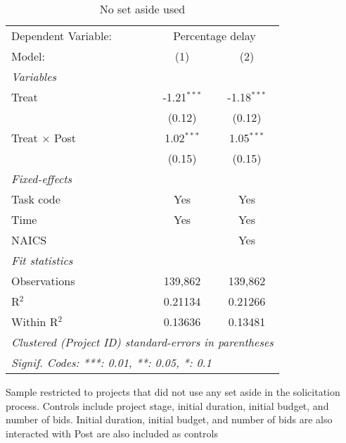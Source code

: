 \documentclass[
]{article}
\begin{document}
\begin{table}[htbp]
   \caption{No set aside used}
   \centering
   \begin{tabular}{lcc}
      \tabularnewline \midrule \midrule
      Dependent Variable: & \multicolumn{2}{c}{Percentage delay}\\
      Model:               & (1)           & (2)\\  
      \midrule
      \emph{Variables}\\
      Treat                & -1.21$^{***}$ & -1.18$^{***}$\\   
                           & (0.12)        & (0.12)\\   
      Treat $\times$ Post  & 1.02$^{***}$  & 1.05$^{***}$\\   
                           & (0.15)        & (0.15)\\   
      \midrule
      \emph{Fixed-effects}\\
      Task code            & Yes           & Yes\\  
      Time                 & Yes           & Yes\\  
      NAICS                &               & Yes\\  
      \midrule
      \emph{Fit statistics}\\
      Observations         & 139,862       & 139,862\\  
      R$^2$                & 0.21134       & 0.21266\\  
      Within R$^2$         & 0.13636       & 0.13481\\  
      \midrule \midrule
      \multicolumn{3}{l}{\emph{Clustered (Project ID) standard-errors in parentheses}}\\
      \multicolumn{3}{l}{\emph{Signif. Codes: ***: 0.01, **: 0.05, *: 0.1}}\\
   \end{tabular}
   
   \par \raggedright 
   Sample restricted to projects that did not use any set aside in the solicitation process. Controls include project stage, initial duration, initial budget, and number of bids. Initial duration, initial budget, and number of bids are also interacted with Post are also included as controls
\end{table}
\end{document}
